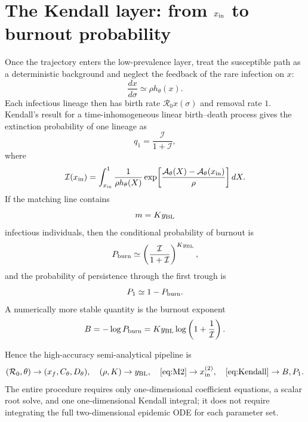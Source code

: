 \documentclass[11pt,a4paper]{article}
\newcommand{\Rzero}{\mathcal R_0}
\newcommand{\Afun}{\mathcal A_\theta}
\newcommand{\BL}{y_{\rm BL}}
\newcommand{\xin}{x_{\rm in}}
\newcommand{\xf}{x_f}
\newcommand{\Pone}{P_1}
\newcommand{\Pburn}{P_{\rm burn}}
\begin{document}
\section{The Kendall layer: from $x_{\rm in}$ to burnout probability}
Once the trajectory enters the low-prevalence layer, treat the susceptible path as a deterministic background and neglect the feedback of the rare infection on $x$:
\[
\frac{dx}{d\sigma}\simeq\rho h_\theta(x).
\]
Each infectious lineage then has birth rate $\Rzero x(\sigma)$ and removal rate $1$. Kendall's result for a time-inhomogeneous linear birth--death process gives the extinction probability of one lineage as
\begin{equation}
\label{eq:q}
q_1=\frac{\mathcal I}{1+\mathcal I},
\end{equation}
where
\begin{equation}
\label{eq:Kendall}
\mathcal I(\xin)
=\int_{\xin}^{1}
\frac1{\rho h_\theta(X)}
\exp\!\left[
\frac{\Afun(X)-\Afun(\xin)}{\rho}
\right]dX.
\end{equation}
If the matching line contains
\[
m=K\BL
\]
infectious individuals, then the conditional probability of burnout is
\begin{equation}
\label{eq:Pburn}
\Pburn
\simeq\left(\frac{\mathcal I}{1+\mathcal I}\right)^{K\BL},
\end{equation}
and the probability of persistence through the first trough is
\begin{equation}
\label{eq:P1}
\Pone\simeq1-\Pburn.
\end{equation}
A numerically more stable quantity is the burnout exponent
\begin{equation}
\label{eq:B}
B=-\log\Pburn
=K\BL\log\left(1+\frac1{\mathcal I}\right).
\end{equation}

Hence the high-accuracy semi-analytical pipeline is
\[
(\Rzero,\theta)\to(\xf,C_\theta,D_\theta),
\quad
(\rho,K)\to\BL,
\quad
\eqref{eq:M2}\to x_{\rm in}^{(2)},
\quad
\eqref{eq:Kendall}\to B,\Pone.
\]
The entire procedure requires only one-dimensional coefficient equations, a scalar root solve, and one one-dimensional Kendall integral; it does not require integrating the full two-dimensional epidemic ODE for each parameter set.
\end{document}
